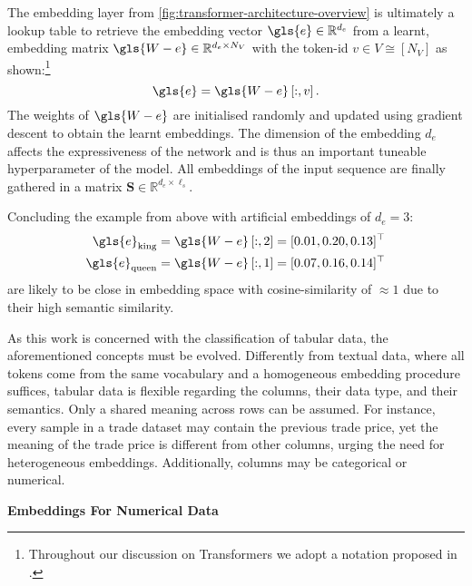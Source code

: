 The embedding layer from \cref{fig:transformer-architecture-overview} is ultimately a lookup table to retrieve the embedding vector $\gls{e} \in \mathbb{R}^{d_{e}}$ from a learnt, embedding matrix $\gls{W-e} \in \mathbb{R}^{d_{e} \times N_{V}}$ with the token-id $v \in V \cong\left[N_{V}\right]$ as shown:\footnote{Throughout our discussion on Transformers we adopt a notation proposed in \textcite[][1--16]{phuongFormalAlgorithmsTransformers2022}.}
\begin{equation}
    \gls{e}=\gls{W-e}\left[:, v\right].
    \label{eq:word-embeddings}
\end{equation}
The weights of $\gls{W-e}$ are initialised randomly and updated using gradient descent to obtain the learnt embeddings. The dimension of the embedding $d_e$ affects the expressiveness of the network and is thus an important tuneable hyperparameter of the model. All embeddings of the input sequence are finally gathered in a matrix $\mathbf{S} \in \mathbb{R}^{d_e \times \ell_s}$.

Concluding the example from above with artificial embeddings of $d_e=3$:
\begin{equation}
    \begin{aligned}
        \gls{e}_{\mathrm{king}}  & =\gls{W-e}\left[:,2\right] = [0.01, 0.20, 0.13]^{\top} \\
        \gls{e}_{\mathrm{queen}} & =\gls{W-e}\left[:,1\right] = [0.07, 0.16, 0.14]^{\top} \\
    \end{aligned}
\end{equation}
are likely to be close in embedding space with cosine-similarity of $\approx 1$ due to their high semantic similarity.

As this work is concerned with the classification of tabular data, the aforementioned concepts must be evolved. Differently from textual data, where all tokens come from the same vocabulary and a homogeneous embedding procedure suffices, tabular data is flexible regarding the columns, their data type, and their semantics. Only a shared meaning across rows can be assumed. For instance, every sample in a trade dataset may contain the previous trade price, yet the meaning of the trade price is different from other columns, urging the need for heterogeneous embeddings. Additionally, columns may be categorical or numerical.

\textbf{Embeddings For Numerical Data}

